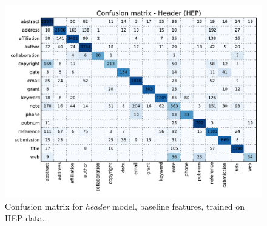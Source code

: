 \begin{figure}[h]
\center
\includegraphics[width=5.5in]{Figures/baseline_confusion_header.pdf}
\caption{Confusion matrix for \emph{header} model, baseline features, trained on HEP data..}
\label{fig:confusion_header}
\end{figure}
